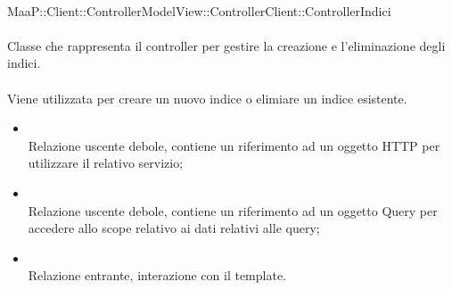 	\\
	MaaP::Client::ControllerModelView::ControllerClient::ControllerIndici\\
	\\
	Classe che rappresenta il controller per gestire la creazione e l'eliminazione degli indici.\\
	\\
	Viene utilizzata per creare un nuovo indice o elimiare un indice esistente.\\
	\begin{itemize}
	\item{}\\
	Relazione uscente debole, contiene un riferimento ad un oggetto HTTP per utilizzare il relativo servizio;
	\item{}\\
	Relazione uscente debole, contiene un riferimento ad un oggetto Query per accedere allo scope relativo ai dati relativi alle query;
	\item{}\\
	Relazione entrante, interazione con il template.
	\end{itemize}
	
